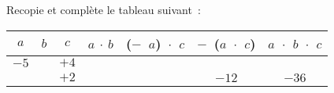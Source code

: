 \begin{exercice}
Recopie et complète le tableau suivant :
\begin{center}
\begin{tabular}{|c|c|c|c|c|c|c|}
\hline
\cellcolor{H2} $a$ & \cellcolor{H2} $b$ & \cellcolor{H2} $c$ & \cellcolor{A2} $a$ $\cdot$ $b$ &  \cellcolor{A2} ($-$ $a$) $\cdot$ $c$ &  \cellcolor{A2} $-$ ($a$ $\cdot$ $c$) &  \cellcolor{A2} $a$ $\cdot$ $b$ $\cdot$ $c$ \\\hline 
\cellcolor{H3} $- 5$ & \cellcolor{H3} & \cellcolor{H3} $+ 4$ & \cellcolor{A3} & \cellcolor{A3} & \cellcolor{A3} & \cellcolor{A3} \\\hline
\cellcolor{H3} & \cellcolor{H3} & \cellcolor{H3} $+ 2$ & \cellcolor{A3} & \cellcolor{A3} & \cellcolor{A3} $- 12$ & \cellcolor{A3} $- 36$ \\\hline
 \end{tabular}
 \end{center}
\end{exercice}